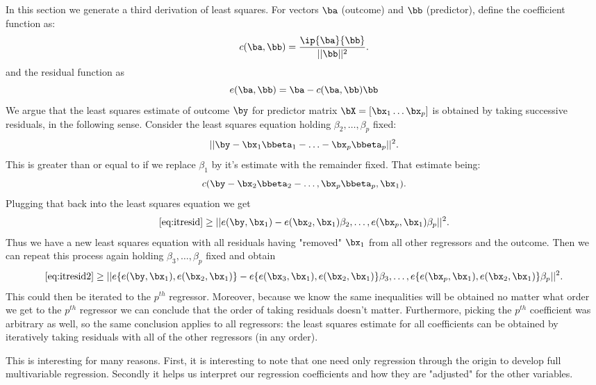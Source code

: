 In this section we generate a third derivation
of least squares. 
For vectors $\ba$ (outcome) and $\bb$ (predictor), define the coefficient function as:
$$
c(\ba, \bb)
= \frac{\ip{\ba}{\bb}}{|| \bb ||^2}.
$$
and the residual function as
$$
e(\ba, \bb) = \ba - c(\ba, \bb) \bb
$$
We argue that the least squares estimate of outcome
$\by$ for predictor matrix $\bX = [\bx_1 \ldots \bx_p]$
is obtained by taking successive residuals, in the following sense. Consider the least squares
equation holding $\beta_2, \ldots, \beta_p$ fixed:
\begin{equation}
\label{eq:itresid}
|| \by - \bx_1 \bbeta_1 - \ldots - \bx_p \bbeta_p||^2.
\end{equation}
This is greater than or equal to
if we replace $\beta_1$ by it's
estimate with the remainder fixed. That estimate
being:
$$
c(\by - \bx_2 \bbeta_2 - \ldots, \bx_p \bbeta_p, \bx_1).
$$
Plugging that back into the least squares equation we
get
\begin{equation}
\label{eq:itresid2}
\eqref{eq:itresid}\geq ||e(\by, \bx_1) - 
e(\bx_2, \bx_1) \beta_2, \ldots, e(\bx_p, \bx_1) \beta_p||^2.
\end{equation}
Thus we have a new least squares equation with 
all residuals having "removed" $\bx_1$ from all other
regressors and the outcome. Then we can repeat this
process again holding $\beta_3, \ldots, \beta_p$
fixed and obtain
$$
\eqref{eq:itresid2}\geq ||e\{e(\by, \bx_1), e(\bx_2, \bx_1)\} - 
e\{e(\bx_3, \bx_1), e(\bx_2, \bx_1)\} \beta_3, \ldots, e\{e(\bx_p, \bx_1), e(\bx_{2}, \bx_1)\} \beta_p||^2.
$$
This could then be iterated to the $p^{th}$ regressor.
Moreover, because we know the same inequalities will be
obtained no matter what order we get to the $p^{th}$
regressor we can conclude that the order of taking
residuals doesn't matter. Furthermore, picking the
$p^{th}$ coefficient was arbitrary as well, so the
same conclusion applies to all regressors: the
least squares estimate for all coefficients can be
obtained by iteratively taking residuals with all of the
other regressors (in any order). 

This is interesting for many reasons. First, it
is interesting to note that one need only 
regression through the origin to develop full
multivariable regression. Secondly it helps
us interpret our regression coefficients and
how they are "adjusted" for the other variables.

